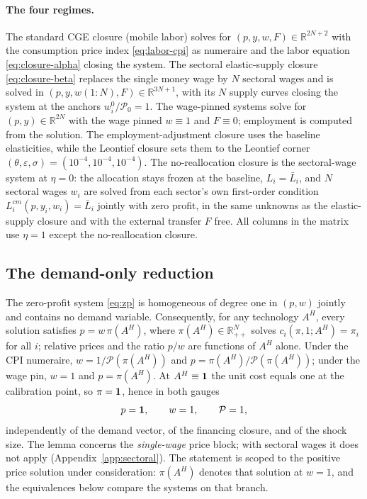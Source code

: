 \paragraph{The four regimes.} The standard CGE closure (mobile labor) solves for
$(p, y, w, F) \in \mathbb{R}^{2N+2}$ with the consumption price index
\eqref{eq:labor-cpi} as numeraire and the labor equation
\eqref{eq:closure-alpha} closing the system. The sectoral elastic-supply closure
\eqref{eq:closure-beta} replaces the single money wage by $N$ sectoral wages and
is solved in $(p, y, w(1{:}N), F) \in \mathbb{R}^{3N+1}$, with its $N$ supply
curves closing the system at the anchors $w_i^{0}/\mathcal{P}_0 = 1$. The wage-pinned systems solve for $(p, y) \in \mathbb{R}^{2N}$ with the
wage pinned $w \equiv 1$ and $F \equiv 0$; employment is computed from the
solution. The employment-adjustment closure uses the baseline elasticities,
while the Leontief closure sets them to the Leontief
corner $(\theta,\varepsilon,\sigma) = (10^{-4},10^{-4},10^{-4})$. The no-reallocation closure is the sectoral-wage system at
$\eta = 0$: the
allocation stays frozen at the baseline, $L_i = \bar{L}_i$, and $N$ sectoral
wages $w_i$ are solved from each sector's own first-order condition
$L^{cm}_i(p, y_i, w_i) = \bar{L}_i$ jointly with zero profit, in the same unknowns as the
elastic-supply closure and with the external transfer $F$ free. All columns
in the matrix use $\eta = 1$ except the no-reallocation closure.

\subsection{The demand-only reduction}\label{app:reduction}

\begin{lemma}\label{lem:price}
The zero-profit system \eqref{eq:zp} is homogeneous of degree one in
$(p,w)$ jointly and contains no demand variable. Consequently, for any
technology $A^{H}$, every solution satisfies $p = w\,\pi(A^{H})$, where
$\pi(A^{H}) \in \mathbb{R}^N_{++}$ solves $c_i(\pi,1;A^{H}) = \pi_i$ for all $i$;
relative prices and the ratio $p/w$ are functions of $A^{H}$ alone. Under the
CPI numeraire, $w = 1/\mathcal{P}(\pi(A^{H}))$ and $p = \pi(A^{H})/\mathcal{P}(\pi(A^{H}))$; under the
wage pin, $w = 1$ and $p = \pi(A^{H})$. At $A^{H} \equiv \mathbf{1}$ the unit cost equals one
at the calibration point, so $\pi = \mathbf{1}$, hence in both gauges
\begin{equation}
p = \mathbf{1}, \qquad w = 1, \qquad \mathcal{P} = 1,
\end{equation}
independently of the demand vector, of the financing closure, and of the
shock size. The lemma concerns the \emph{single-wage} price block; with
sectoral wages it does not apply (Appendix~\ref{app:sectoral}). The statement is scoped to the positive price solution under consideration:
$\pi(A^{H})$ denotes that solution at $w=1$,
and the equivalences below compare the systems on that branch.
\end{lemma}

